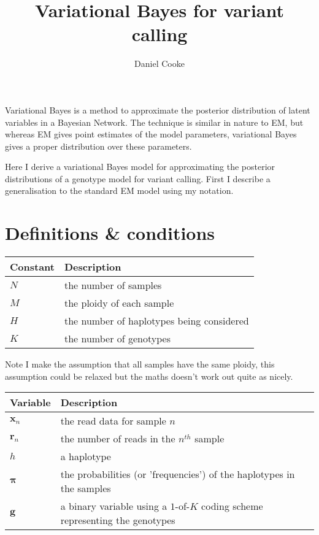 \documentclass{article}
\title{Variational Bayes for variant calling}
\author{Daniel Cooke}
\date{}
\begin{document}
\maketitle

Variational Bayes is a method to approximate the posterior distribution of latent variables in a Bayesian Network. The technique is similar in nature to EM, but whereas EM gives point estimates of the model parameters, variational Bayes gives a proper distribution over these parameters.

Here I derive a variational Bayes model for approximating the posterior distributions of a genotype model for variant calling. First I describe a generalisation to the standard EM model using my notation.

\section{Definitions \& conditions}

\begin{center}
\begin{tabular}{ll}
Constant & Description \\
\hline
$N$ & the number of samples \\
$M$ & the ploidy of each sample \\
$H$ & the number of haplotypes being considered \\
$K$ & the number of genotypes \\
\hline
\end{tabular}
\end{center}

Note I make the assumption that all samples have the same ploidy, this assumption could be relaxed but the maths doesn't work out quite as nicely.

\begin{center}
\begin{tabular}{ll}
Variable & Description \\
\hline
$\boldsymbol{x}_n$ & the read data for sample $n$ \\
$\boldsymbol{r}_n$ & the number of reads in the $n^{th}$ sample \\
$h$ & a haplotype \\
$\boldsymbol{\pi}$ & the probabilities (or 'frequencies') of the haplotypes in the samples \\
$\boldsymbol{g}$ & a binary variable using a $1$-of-$K$ coding scheme representing the genotypes \\
\hline
\end{tabular}
\end{center}
\end{document}
